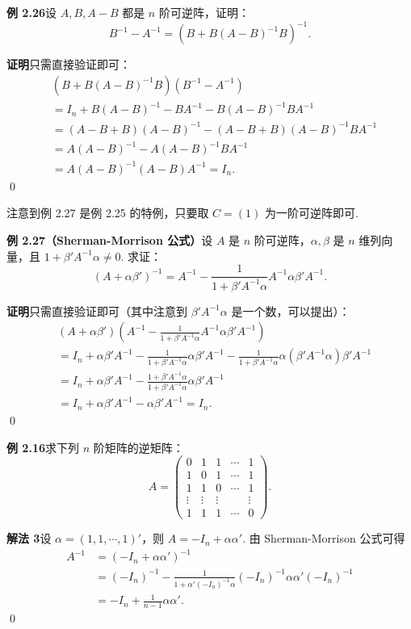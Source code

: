 \documentclass[UTF8,12pt,a4paper,fontset=fandol]{ctexart}
\begin{document}
\noindent\textbf{例 2.26}\quad 设 $A,B,A-B$ 都是 $n$ 阶可逆阵，证明：
\[
B^{-1}-A^{-1}=(B+B(A-B)^{-1}B)^{-1}.
\]

\noindent\textbf{证明}\quad 只需直接验证即可：
\[
\begin{aligned}
&(B+B(A-B)^{-1}B)(B^{-1}-A^{-1})\\
&=I_n+B(A-B)^{-1}-BA^{-1}-B(A-B)^{-1}BA^{-1}\\
&=(A-B+B)(A-B)^{-1}-(A-B+B)(A-B)^{-1}BA^{-1}\\
&=A(A-B)^{-1}-A(A-B)^{-1}BA^{-1}\\
&=A(A-B)^{-1}(A-B)A^{-1}=I_n.
\end{aligned}
\]
\qed

注意到例 2.27 是例 2.25 的特例，只要取 $C=(1)$ 为一阶可逆阵即可.

\noindent\textbf{例 2.27（Sherman-Morrison 公式）}\quad 设 $A$ 是 $n$ 阶可逆阵，$\alpha,\beta$ 是 $n$ 维列向量，且 $1+\beta'A^{-1}\alpha\ne0$. 求证：
\[
(A+\alpha\beta')^{-1}
=A^{-1}-\frac1{1+\beta'A^{-1}\alpha}A^{-1}\alpha\beta'A^{-1}.
\]

\noindent\textbf{证明}\quad 只需直接验证即可（其中注意到 $\beta'A^{-1}\alpha$ 是一个数，可以提出）：
\[
\begin{aligned}
&(A+\alpha\beta')\left(A^{-1}-\frac1{1+\beta'A^{-1}\alpha}A^{-1}\alpha\beta'A^{-1}\right)\\
&=I_n+\alpha\beta'A^{-1}
-\frac1{1+\beta'A^{-1}\alpha}\alpha\beta'A^{-1}
-\frac1{1+\beta'A^{-1}\alpha}\alpha(\beta'A^{-1}\alpha)\beta'A^{-1}\\
&=I_n+\alpha\beta'A^{-1}
-\frac{1+\beta'A^{-1}\alpha}{1+\beta'A^{-1}\alpha}\alpha\beta'A^{-1}\\
&=I_n+\alpha\beta'A^{-1}-\alpha\beta'A^{-1}=I_n.
\end{aligned}
\]
\qed

\noindent\textbf{例 2.16}\quad 求下列 $n$ 阶矩阵的逆矩阵：
\[
A=
\left(
\begin{array}{ccccc}
0 & 1 & 1 & \cdots & 1\\
1 & 0 & 1 & \cdots & 1\\
1 & 1 & 0 & \cdots & 1\\
\vdots & \vdots & \vdots & & \vdots\\
1 & 1 & 1 & \cdots & 0
\end{array}
\right).
\]

\noindent\textbf{解法 3}\quad 设 $\alpha=(1,1,\cdots,1)'$，则 $A=-I_n+\alpha\alpha'$. 由 Sherman-Morrison 公式可得
\[
\begin{aligned}
A^{-1}
&=(-I_n+\alpha\alpha')^{-1}\\
&=(-I_n)^{-1}
-\frac1{1+\alpha'(-I_n)^{-1}\alpha}(-I_n)^{-1}\alpha\alpha'(-I_n)^{-1}\\
&=-I_n+\frac1{n-1}\alpha\alpha'.
\end{aligned}
\]
\qed
\end{document}
